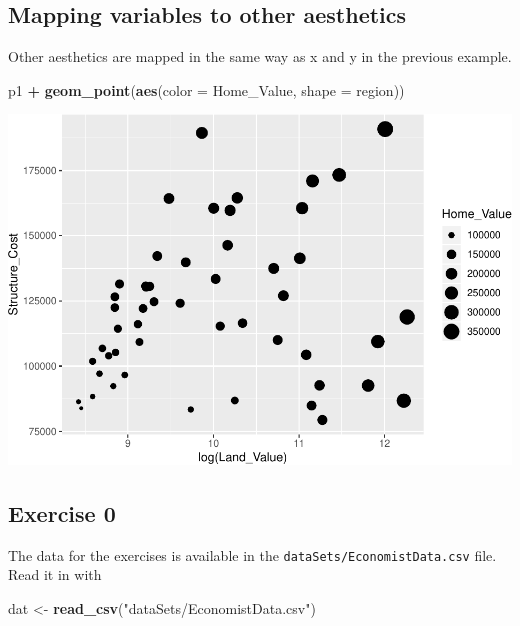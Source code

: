 \documentclass[
]{book}
\newenvironment{Shaded}{\begin{snugshade}}{\end{snugshade}}
\newcommand{\DataTypeTok}[1]{\textcolor[rgb]{0.13,0.29,0.53}{#1}}
\newcommand{\KeywordTok}[1]{\textcolor[rgb]{0.13,0.29,0.53}{\textbf{#1}}}
\newcommand{\NormalTok}[1]{#1}
\newcommand{\OperatorTok}[1]{\textcolor[rgb]{0.81,0.36,0.00}{\textbf{#1}}}
\newcommand{\StringTok}[1]{\textcolor[rgb]{0.31,0.60,0.02}{#1}}
\begin{document}
\hypertarget{mapping-variables-to-other-aesthetics}{%
\subsection{Mapping variables to other aesthetics}\label{mapping-variables-to-other-aesthetics}}

Other aesthetics are mapped in the same way as x and y in the previous example.

\begin{Shaded}
\begin{Highlighting}[]
\NormalTok{p1 }\OperatorTok{+}
\StringTok{  }\KeywordTok{geom\_point}\NormalTok{(}\KeywordTok{aes}\NormalTok{(}\DataTypeTok{color =}\NormalTok{ Home\_Value, }\DataTypeTok{shape =}\NormalTok{ region))}
\end{Highlighting}
\end{Shaded}

\includegraphics{R/Rgraphics/figures/unnamed-chunk-152-1.pdf}

\hypertarget{exercise-0-2}{%
\subsection{Exercise 0}\label{exercise-0-2}}

The data for the exercises is available in the \texttt{dataSets/EconomistData.csv} file. Read it in with

\begin{Shaded}
\begin{Highlighting}[]
\NormalTok{dat \textless{}{-}}\StringTok{ }\KeywordTok{read\_csv}\NormalTok{(}\StringTok{"dataSets/EconomistData.csv"}\NormalTok{)}
\end{Highlighting}
\end{Shaded}
\end{document}
